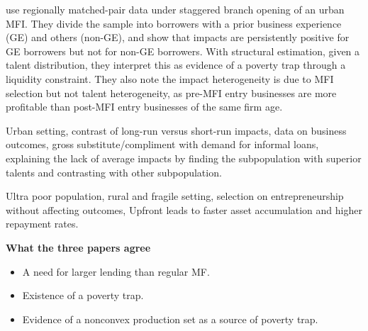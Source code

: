 	\citet{Banerjee2019MFPovertyTrap} use regionally matched-pair data under staggered branch opening of an urban MFI. They divide the sample into borrowers with a prior business experience (GE) and others (non-GE), and show that impacts are persistently positive for GE borrowers but not for non-GE borrowers. With structural estimation, given a talent distribution, they interpret this as evidence of a poverty trap through a liquidity constraint. They also note the impact heterogeneity is due to MFI selection but not talent heterogeneity, as pre-MFI entry businesses are more profitable than post-MFI entry businesses of the same firm age. 

\begin{description}
\vspace{1.0ex}\setlength{\itemsep}{1.0ex}\setlength{\baselineskip}{12pt}
\item[their strength]	Urban setting, contrast of long-run versus short-run impacts, data on business outcomes, gross substitute/compliment with demand for informal loans, explaining the lack of average impacts by finding the subpopulation with superior talents and contrasting with other subpopulation.
\item[our strength]	Ultra poor population, rural and fragile setting, selection on entrepreneurship without affecting outcomes, \textsf{Upfront} leads to faster asset accumulation and higher repayment rates.
\end{description}

\noindent
\textbf{What the three papers agree}

\begin{itemize}
\vspace{1.0ex}\setlength{\itemsep}{1.0ex}\setlength{\baselineskip}{12pt}
\item	A need for larger lending than regular MF.
\item	Existence of a poverty trap.
\item	Evidence of a nonconvex production set as a source of poverty trap.
\end{itemize}

\newpage
{}
\setcounter{tocdepth}{3}
\tableofcontents
\thispagestyle{empty}\setcounter{page}{0}
\newpage

\setlength{\parindent}{1em}
\vspace{2ex}




\renewcommand{\thefootnote}{*\arabic{footnote}}
\setcounter{footnote}{0}



